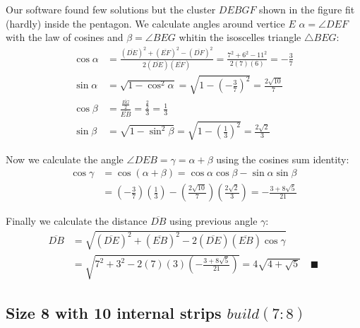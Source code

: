 \documentclass[11pt]{article}
\begin{document}
Our software found few solutions but the cluster $DEBGF$ shown in the figure fit (hardly) inside the pentagon. We calculate angles around vertice $E$ $\alpha = \angle{DEF}$ with the law of cosines and $\beta = \angle{BEG}$ whitin the isoscelles triangle $\triangle{BEG}$:
\begin{align}
\cos\alpha &= \frac{(\overline{DE})^2 + (\overline{EF})^2 - (\overline{DF})^2}
 {2(\overline{DE})(\overline{EF})} 
 = \frac{7^2 + 6^2 - 11^2}{2(7)(6)} = -\frac{3}7 \\
\sin\alpha &= \sqrt{1 - \cos^2\alpha}
 = \sqrt{1 - \left(-\frac{3}{7}\right)^2} = \frac{2\sqrt{10}}7 \\
\cos\beta &= \frac{\frac{\overline{EG}}2}{\overline{EB}}
 = \frac{\frac{2}{2}}{3} = \frac{1}3\\
\sin\beta &= \sqrt{1 - \sin^2{\beta}}
 = \sqrt{1 - \left(\frac{1}3\right)^2} = \frac{2\sqrt2}3
\end{align}

Now we calculate the angle $\angle{DEB} = \gamma = \alpha + \beta$ using the cosines sum identity:
\begin{align}
\cos\gamma &= \cos(\alpha + \beta)
 = \cos\alpha\cos\beta - \sin\alpha\sin\beta \nonumber\\
 &= \left(-\frac{3}7\right)\left(\frac{1}3\right)
  - \left(\frac{2\sqrt{10}}7\right)\left(\frac{2\sqrt2}3\right)
  = -\frac{3 + 8\sqrt{5}}{21}
\end{align}

Finally we calculate the distance $\overline{DB}$ using previous angle $\gamma$:
\begin{align}
\overline{DB} &= \sqrt{(\overline{DE})^2 + (\overline{EB})^2
 - 2(\overline{DE})(\overline{EB})\cos\gamma} \nonumber\\
 &= \sqrt{7^2 + 3^2 - 2(7)(3)\left(-\frac{3 + 8\sqrt{5}}{21}\right)} 
 = 4\sqrt{4 + \sqrt5} \quad\blacksquare
\end{align}

\subsection{Size 8 with 10 internal strips $build(7:8)$}
\end{document}
